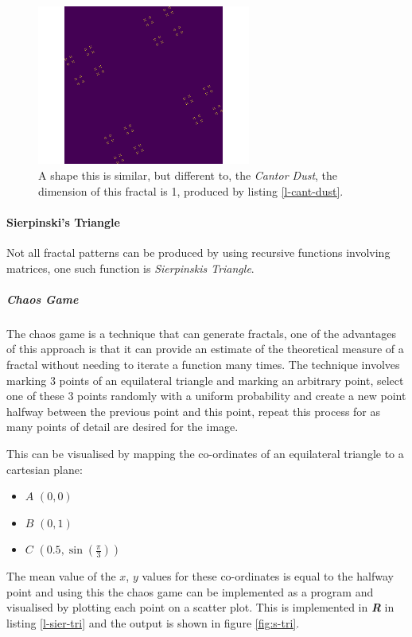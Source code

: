 \documentclass[a4paper,11pt,twoside]{article}
\begin{document}
\begin{figure}[htbp]
\centering
\includegraphics[width=7cm]{media/Cantor_Dust_gen.png}
\caption{\label{fig:cantor-dust}A shape this is similar, but different to, the \emph{Cantor Dust}, the dimension of this fractal is 1, produced by listing \ref{l-cant-dust}.}
\end{figure}



\paragraph{Sierpinski's Triangle}
\label{sec:org6492b57}
Not all fractal patterns can be produced by using recursive functions involving matrices, one such function is \emph{Sierpinskis Triangle}.
\subparagraph{Chaos Game}
\label{sec:org285b310}
The chaos game is a technique that can generate fractals, one of the advantages of this approach is that it can provide an estimate of the theoretical measure of a fractal without needing to iterate a function many times. The technique involves marking 3 points of an equilateral triangle and marking an arbitrary point, select one of these 3 points randomly with a uniform probability and create a new point halfway between the previous point and this point, repeat this process for as many points of detail are desired for the image.

This can be visualised by mapping the co-ordinates of an equilateral triangle to a cartesian plane:

\begin{itemize}
\item \(A\)  \(\left(0, 0\right)\)
\item \(B\)  \(\left(0, 1\right)\)
\item \(C\)  \(\left(0.5, \sin\left(\frac{\pi}{3}\right)\right)\)
\end{itemize}

The mean value of the \(x\), \(y\) values for these co-ordinates is equal to the
halfway point and using this the chaos game can be implemented as a program and
visualised by plotting each point on a scatter plot. This is implemented in
\emph{\textbf{R}} in listing \ref{l-sier-tri} and the output is shown in figure \ref{fig:s-tri}.
\end{document}

